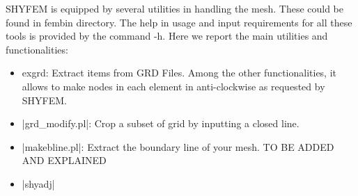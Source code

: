 SHYFEM is equipped by several utilities in handling the mesh. These could be found in fembin directory. The help in usage and input requirements for all these tools is provided by the command -h.
Here we report the main utilities and functionalities:
\begin{itemize}
\item exgrd: Extract items from GRD Files. Among the other functionalities, it allows to make nodes in each element in anti-clockwise as requested by SHYFEM.   
\item |grd_modify.pl|: Crop a subset of grid by inputting a closed line. 
\item |makebline.pl|: Extract the boundary line of your mesh.
TO BE ADDED AND EXPLAINED
\item |shyadj|

\end{itemize}
